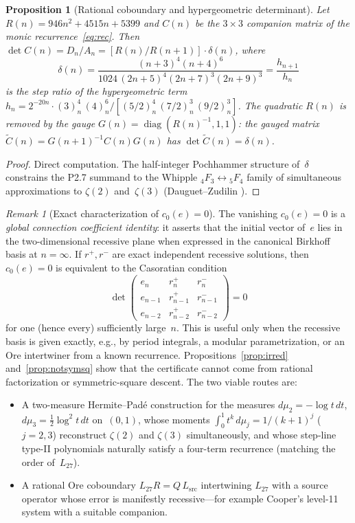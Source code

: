 \documentclass[11pt]{article}
\newtheorem{proposition}[theorem]{Proposition}
\theoremstyle{remark}
\newtheorem*{remark}{Remark}
\begin{document}
\begin{proposition}[Rational coboundary and hypergeometric
determinant]\label{prop:coboundary}
Let $R(n) = 946n^2 + 4515n + 5399$ and
$C(n)$ be the $3\times 3$ companion matrix of the monic
recurrence~\eqref{eq:rec}. Then
$\det C(n) = D_n/A_n = [R(n)/R(n{+}1)]\cdot\delta(n)$,
where
\[
\delta(n) = \frac{(n{+}3)^4(n{+}4)^6}
{1024\,(2n{+}5)^4(2n{+}7)^3(2n{+}9)^3}
= \frac{h_{n+1}}{h_n}
\]
is the step ratio of the hypergeometric term
$h_n = 2^{-20n}\cdot
(3)_n^4\,(4)_n^6/[(5/2)_n^4\,(7/2)_n^3\,(9/2)_n^3]$.
The quadratic $R(n)$ is removed by the gauge
$G(n) = \operatorname{diag}(R(n)^{-1},1,1)$:
the gauged matrix $\widetilde{C}(n) = G(n{+}1)^{-1}C(n)G(n)$
has $\det\widetilde{C}(n) = \delta(n)$.
\end{proposition}
\begin{proof}
Direct computation. The half-integer Pochhammer
structure of~$\delta$ constrains the P2.7 summand to the
Whipple ${}_4F_3 \leftrightarrow {}_5F_4$ family of
simultaneous approximations to $\zeta(2)$ and~$\zeta(3)$
(Dauguet--Zudilin \cite{DauguetZudilin}).
\end{proof}

\begin{remark}[Exact characterization of $c_0(e) = 0$]
The vanishing $c_0(e) = 0$ is a \emph{global connection
coefficient identity}: it asserts that the initial vector
of~$e$ lies in the two-dimensional recessive plane when
expressed in the canonical Birkhoff basis at $n = \infty$.
If $r^+, r^-$ are exact independent recessive solutions,
then $c_0(e) = 0$ is equivalent to the Casoratian condition
\[
\det\begin{pmatrix}
e_n & r_n^+ & r_n^- \\
e_{n-1} & r_{n-1}^+ & r_{n-1}^- \\
e_{n-2} & r_{n-2}^+ & r_{n-2}^-
\end{pmatrix} = 0
\]
for one (hence every) sufficiently large~$n$.
This is useful only when the recessive basis is given exactly,
e.g., by period integrals, a modular parametrization, or an
Ore intertwiner from a known recurrence.
Propositions~\ref{prop:irred} and~\ref{prop:notsymsq} show
that the certificate cannot come from rational factorization
or symmetric-square descent. The two viable routes are:
\begin{itemize}
\item A two-measure Hermite--Pad\'e construction for the
measures $d\mu_2 = -\!\log t\,dt$, $d\mu_3 =
\tfrac{1}{2}\log^2\!t\,dt$ on~$(0,1)$, whose moments
$\int_0^1 t^k\,d\mu_j = 1/(k{+}1)^j$ ($j = 2, 3$)
reconstruct $\zeta(2)$ and $\zeta(3)$ simultaneously, and
whose step-line type-II polynomials naturally satisfy a
four-term recurrence (matching the order of~$L_{27}$).
\item A rational Ore coboundary
$L_{27} R = Q\,L_{\mathrm{src}}$ intertwining $L_{27}$ with
a source operator whose error is manifestly recessive---for
example Cooper's level-11 system with a suitable companion.
\end{itemize}
\end{remark}
\end{document}
